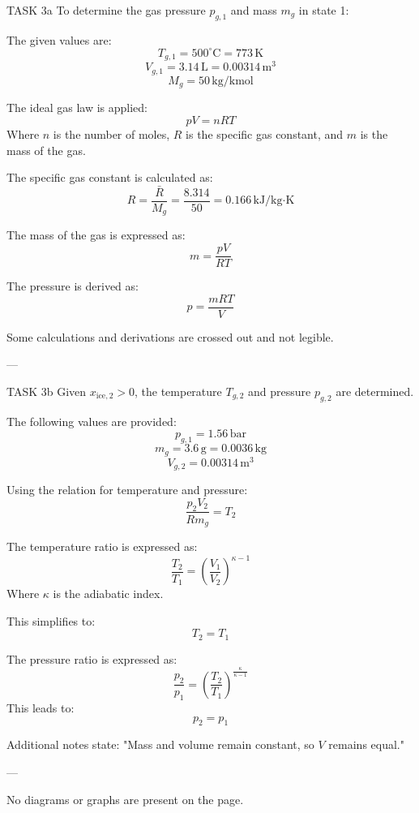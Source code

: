 TASK 3a  
To determine the gas pressure \( p_{g,1} \) and mass \( m_g \) in state 1:  

The given values are:  
\[
T_{g,1} = 500^\circ\text{C} = 773 \, \text{K}
\]
\[
V_{g,1} = 3.14 \, \text{L} = 0.00314 \, \text{m}^3
\]
\[
M_g = 50 \, \text{kg/kmol}
\]

The ideal gas law is applied:  
\[
pV = nRT
\]
Where \( n \) is the number of moles, \( R \) is the specific gas constant, and \( m \) is the mass of the gas.  

The specific gas constant is calculated as:  
\[
R = \frac{\bar{R}}{M_g} = \frac{8.314}{50} = 0.166 \, \text{kJ/kg·K}
\]

The mass of the gas is expressed as:  
\[
m = \frac{pV}{RT}
\]

The pressure is derived as:  
\[
p = \frac{mRT}{V}
\]

Some calculations and derivations are crossed out and not legible.  

---

TASK 3b  
Given \( x_{\text{ice},2} > 0 \), the temperature \( T_{g,2} \) and pressure \( p_{g,2} \) are determined.  

The following values are provided:  
\[
p_{g,1} = 1.56 \, \text{bar}
\]
\[
m_g = 3.6 \, \text{g} = 0.0036 \, \text{kg}
\]
\[
V_{g,2} = 0.00314 \, \text{m}^3
\]

Using the relation for temperature and pressure:  
\[
\frac{p_2 V_2}{R m_g} = T_2
\]

The temperature ratio is expressed as:  
\[
\frac{T_2}{T_1} = \left( \frac{V_1}{V_2} \right)^{\kappa - 1}
\]
Where \( \kappa \) is the adiabatic index.  

This simplifies to:  
\[
T_2 = T_1
\]

The pressure ratio is expressed as:  
\[
\frac{p_2}{p_1} = \left( \frac{T_2}{T_1} \right)^{\frac{\kappa}{\kappa - 1}}
\]
This leads to:  
\[
p_2 = p_1
\]

Additional notes state:  
"Mass and volume remain constant, so \( V \) remains equal."

---

No diagrams or graphs are present on the page.